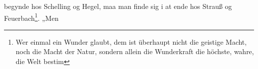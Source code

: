 \documentclass[12pt,a4paper]{book}
\begin{document}
begynde hos Schelling og Hegel, maa man finde sig i at ende hos Strauß og
Feuerbach\footnote{Wer einmal ein Wunder glaubt, dem ist überhaupt nicht die geistige Macht,
noch die Macht der Natur, sondern allein die Wunderkraft die höchste, wahre, die Welt
bestim\-%
}. „Men
\end{document}

